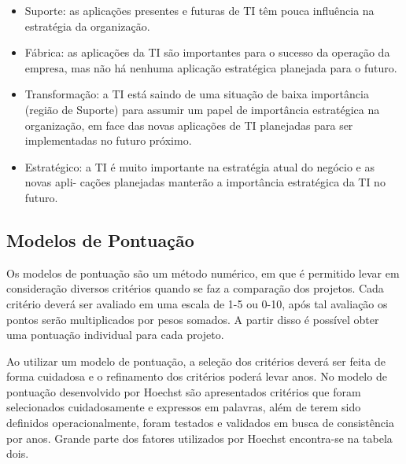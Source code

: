 \documentclass[12pt,a4paper,ruledheader,tocpage=prefix,floatnumber=continuous,pagestart=folhaderosto,font=times]{abnt}
\begin{document}
\begin{itemize}
 \item Suporte: as aplicações presentes e futuras de TI têm pouca influência na estratégia da
	organização.
  \item Fábrica: as aplicações da TI são importantes para o sucesso da operação da empresa, 
	mas não há nenhuma aplicação estratégica planejada para o futuro.
  \item Transformação: a TI está saindo de uma situação de baixa importância (região de
	Suporte) para assumir um papel de importância estratégica na organização, em
        face das novas aplicações de TI planejadas para ser implementadas no futuro próximo.
  \item Estratégico: a TI é muito importante na estratégia atual do negócio e as novas apli-
        cações planejadas manterão a importância estratégica da TI no futuro.
\end{itemize}

\subsection{Modelos de Pontuação}
Os modelos de pontuação são um método numérico, em que é permitido levar em consideração diversos critérios quando se faz a comparação dos projetos. Cada
critério deverá ser avaliado em uma escala de 1-5 ou 0-10, após tal avaliação os pontos serão multiplicados por pesos somados. A partir disso é possível
obter uma pontuação individual para cada projeto. 

Ao utilizar um modelo de pontuação, a seleção dos critérios deverá ser feita de forma cuidadosa e o refinamento dos critérios poderá levar anos. No modelo 
de pontuação desenvolvido por Hoechst são apresentados critérios que foram selecionados cuidadosamente e expressos em palavras, além de terem sido definidos 
operacionalmente, foram testados e validados em busca de consistência por anos. Grande parte dos fatores utilizados por Hoechst encontra-se na tabela dois.
\end{document}
